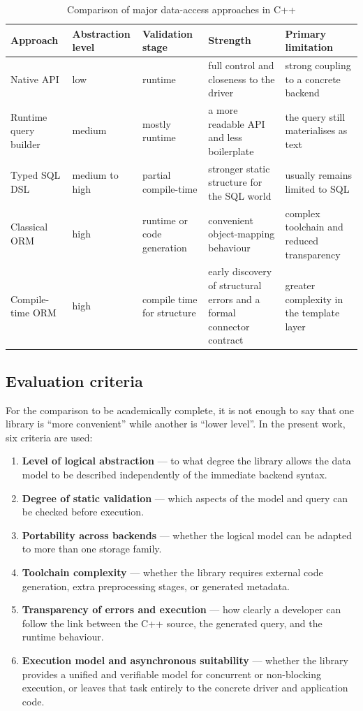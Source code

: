 \begin{table}[H]
\centering
\caption{Comparison of major data-access approaches in C++}
\label{tab:existing_solutions_comparison}
\begin{tabular}{L{3.2cm}L{2.5cm}L{2.7cm}L{2.9cm}L{2.8cm}}
\toprule
\textbf{Approach} & \textbf{Abstraction level} & \textbf{Validation stage} & \textbf{Strength} & \textbf{Primary limitation} \\
\midrule
Native API & low & runtime & full control and closeness to the driver & strong coupling to a concrete backend \\
Runtime query builder & medium & mostly runtime & a more readable API and less boilerplate & the query still materialises as text \\
Typed SQL DSL & medium to high & partial compile-time & stronger static structure for the SQL world & usually remains limited to SQL \\
Classical ORM & high & runtime or code generation & convenient object-mapping behaviour & complex toolchain and reduced transparency \\
Compile-time ORM & high & compile time for structure & early discovery of structural errors and a formal connector contract & greater complexity in the template layer \\
\bottomrule
\end{tabular}
\end{table}

\subsection{Evaluation criteria}

For the comparison to be academically complete, it is not enough to say that one library is ``more convenient'' while another is ``lower level''. In the present work, six criteria are used:

\begin{enumerate}[label=\arabic*.]
    \item \textbf{Level of logical abstraction} --- to what degree the library allows the data model to be described independently of the immediate backend syntax.
    \item \textbf{Degree of static validation} --- which aspects of the model and query can be checked before execution.
    \item \textbf{Portability across backends} --- whether the logical model can be adapted to more than one storage family.
    \item \textbf{Toolchain complexity} --- whether the library requires external code generation, extra preprocessing stages, or generated metadata.
    \item \textbf{Transparency of errors and execution} --- how clearly a developer can follow the link between the C++ source, the generated query, and the runtime behaviour.
    \item \textbf{Execution model and asynchronous suitability} --- whether the library provides a unified and verifiable model for concurrent or non-blocking execution, or leaves that task entirely to the concrete driver and application code.
\end{enumerate}

